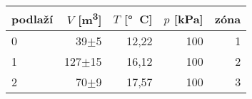 \begin{tabular}{lrrrr}
\toprule
podlaží & $V$ [\si{m^3}]& $T$ [\si{\degree C}]& $p$ [\si{kPa}] & zóna\\
\midrule
0 &         39$\pm$5    & 12,22& 100&1 \\
1 &       127$\pm$15    & 16,12& 100&2 \\
2 &         70$\pm$9    & 17,57& 100&3 \\
\bottomrule
\end{tabular}
